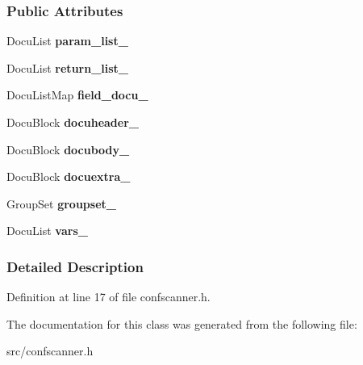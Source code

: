\subsubsection*{Public Attributes}
\begin{DoxyCompactItemize}
\item 
\hypertarget{class_conf_file_scanner_af44ea703336428e2977a6320d9edaca7}{}Docu\+List {\bfseries param\+\_\+list\+\_\+}\label{class_conf_file_scanner_af44ea703336428e2977a6320d9edaca7}

\item 
\hypertarget{class_conf_file_scanner_a6ba315a8cd758d794ce0d228815eb7d2}{}Docu\+List {\bfseries return\+\_\+list\+\_\+}\label{class_conf_file_scanner_a6ba315a8cd758d794ce0d228815eb7d2}

\item 
\hypertarget{class_conf_file_scanner_a3a65d41c3dc7d307f968920bf58b4a36}{}Docu\+List\+Map {\bfseries field\+\_\+docu\+\_\+}\label{class_conf_file_scanner_a3a65d41c3dc7d307f968920bf58b4a36}

\item 
\hypertarget{class_conf_file_scanner_ac2c307f88079904d9dd94e3621a3b578}{}Docu\+Block {\bfseries docuheader\+\_\+}\label{class_conf_file_scanner_ac2c307f88079904d9dd94e3621a3b578}

\item 
\hypertarget{class_conf_file_scanner_a5331d99d566ecca7bce5d3152c2f350d}{}Docu\+Block {\bfseries docubody\+\_\+}\label{class_conf_file_scanner_a5331d99d566ecca7bce5d3152c2f350d}

\item 
\hypertarget{class_conf_file_scanner_aa8c636848dd3c60f816abc352042ff41}{}Docu\+Block {\bfseries docuextra\+\_\+}\label{class_conf_file_scanner_aa8c636848dd3c60f816abc352042ff41}

\item 
\hypertarget{class_conf_file_scanner_a7e9ff114b48972c8999c9b2099372773}{}Group\+Set {\bfseries groupset\+\_\+}\label{class_conf_file_scanner_a7e9ff114b48972c8999c9b2099372773}

\item 
\hypertarget{class_conf_file_scanner_ae9b21a2a61a923e4b7e09dfe2b763dc0}{}Docu\+List {\bfseries vars\+\_\+}\label{class_conf_file_scanner_ae9b21a2a61a923e4b7e09dfe2b763dc0}

\end{DoxyCompactItemize}


\subsubsection{Detailed Description}


Definition at line 17 of file confscanner.\+h.



The documentation for this class was generated from the following file\+:\begin{DoxyCompactItemize}
\item 
src/confscanner.\+h\end{DoxyCompactItemize}
